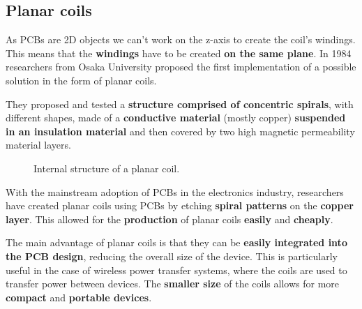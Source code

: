 \subsection{Planar coils}
\label{subsec: Planar_coils}

As PCBs are 2D objects we can't work on the z-axis to create the coil's windings. This means that the \textbf{windings} have to be created \textbf{on the same plane}. 
In 1984 researchers from Osaka University proposed the first implementation of a possible solution in the form of planar coils.

\begin{samepage}
    They proposed and tested a \textbf{structure comprised of concentric spirals}, with different shapes, made of a \textbf{conductive material} (mostly copper) \textbf{suspended in an insulation material} and then covered by two high magnetic permeability material layers\cite{OG_plan_coils}.
    \nopagebreak

    \begin{figure}[H]
        \centering
        
        \caption{Internal structure of a planar coil.}
        \label{fig:Planar_coil_structure}
    \end{figure}
\end{samepage}

With the mainstream adoption of PCBs in the electronics industry, researchers have created planar coils using PCBs by etching \textbf{spiral patterns} on the \textbf{copper layer}. This allowed for the \textbf{production} of planar coils \textbf{easily} and \textbf{cheaply}.

The main advantage of planar coils is that they can be \textbf{easily integrated into the PCB design}, reducing the overall size of the device. This is particularly useful in the case of wireless power transfer systems, where the coils are used to transfer power between devices. The \textbf{smaller size} of the coils allows for more \textbf{compact} and \textbf{portable devices}.

